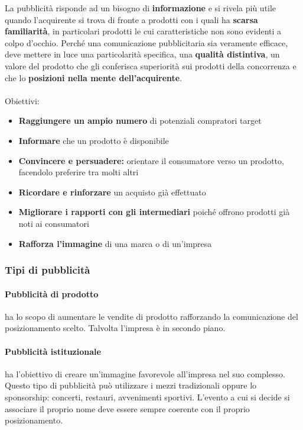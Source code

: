 La pubblicità risponde ad un bisogno di \textbf{informazione} e si
rivela più utile quando l’acquirente si trova di fronte a prodotti con i quali ha \textbf{scarsa familiarità}, in particolari prodotti le cui caratteristiche non sono evidenti a colpo d’occhio.
Perché una comunicazione pubblicitaria sia veramente
efficace, deve mettere in luce una particolarità specifica, una \textbf{qualità distintiva}, un valore del prodotto che gli conferisca superiorità sui prodotti della concorrenza e che lo \textbf{posizioni nella mente dell'acquirente}.
\\
\\
Obiettivi:
\begin{itemize}
	\item \textbf{Raggiungere un ampio numero} di potenziali compratori target
	\item \textbf{Informare} che un prodotto è disponibile
	\item \textbf{Convincere e persuadere:} orientare il consumatore verso un prodotto, facendolo preferire tra molti altri
	\item \textbf{Ricordare e rinforzare} un acquisto già effettuato
	\item \textbf{Migliorare i rapporti con gli intermediari} poiché offrono prodotti già noti ai consumatori
	\item \textbf{Rafforza l’immagine} di una marca o di un’impresa
\end{itemize}

\subsubsection{Tipi di pubblicità}
\paragraph{Pubblicità di prodotto} ha lo scopo di aumentare le vendite di prodotto rafforzando la
comunicazione del posizionamento scelto. Talvolta l’impresa è in secondo piano.
\paragraph{Pubblicità istituzionale}
ha l’obiettivo di creare un’immagine favorevole all'impresa nel suo complesso. Questo tipo di pubblicità può utilizzare i mezzi tradizionali oppure lo sponsorship: concerti, restauri, avvenimenti
sportivi. L’evento a cui si decide si associare il proprio nome deve essere sempre coerente con il proprio posizionamento.


